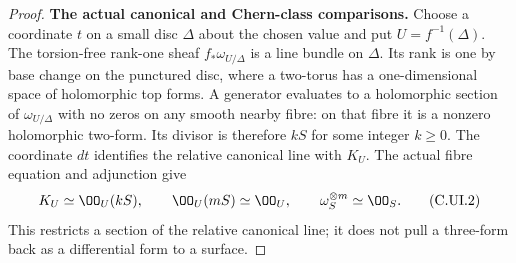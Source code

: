 \begin{proof}
\leavevmode\par\medskip\noindent\textbf{The actual canonical and Chern-class comparisons.}\quad
Choose a coordinate $t$ on a small disc $\Delta$ about the
chosen value and put $U=f^{-1}(\Delta)$. The torsion-free
rank-one sheaf $f_*\omega_{U/\Delta}$ is a line bundle on
$\Delta$. Its rank is one by base change on the punctured
disc, where a two-torus has a one-dimensional space of
holomorphic top forms. A generator evaluates to a
holomorphic section of $\omega_{U/\Delta}$ with no zeros
on any smooth nearby fibre: on that fibre it is a nonzero
holomorphic two-form. Its divisor is therefore $kS$ for
some integer $k\ge0$. The coordinate $dt$ identifies the
relative canonical line with $K_U$. The actual fibre
equation and adjunction give
\[
 K_U\simeq\OO_U(kS),\qquad
 \OO_U(mS)\simeq\OO_U,\qquad
 \omega_S^{\otimes m}\simeq\OO_S.
 \tag{C.UI.2}
\]
This restricts a section of the relative canonical line;
it does not pull a three-form back as a differential form
to a surface.


\end{proof}
